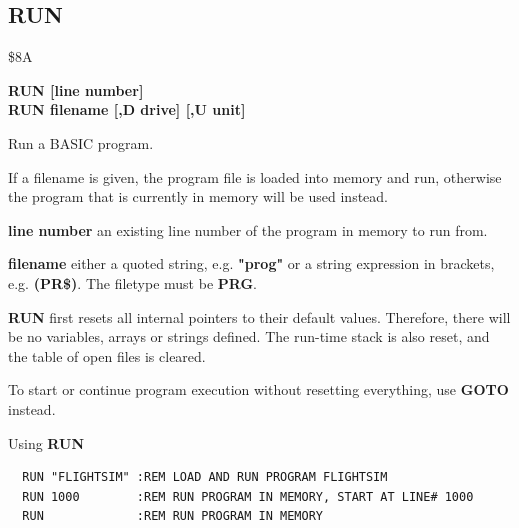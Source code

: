 
\newpage
\subsection{RUN}
\begin{description}[leftmargin=2cm,style=nextline]
\item [Token:] \$8A
\item [Format:] {\bf RUN [line number]} \\
                {\bf RUN filename [,D drive] [,U unit] }
\item [Usage:] Run a BASIC program.

   If a filename is given, the program file is loaded into
   memory and run, otherwise the program that is currently in memory
   will be used instead.

   {\bf line number} an existing line number of the program in memory to run from.

   {\bf filename} either a quoted string, e.g. {\bf "prog"} or
   a string expression in brackets, e.g. {\bf (PR\$)}.
   The filetype must be {\bf PRG}.

   \drivedefinition

   \unitdefinition

   {\bf RUN} first resets all internal pointers to their
   default values. Therefore, there will be no variables, arrays
   or strings defined. The run-time stack is also reset, and the
   table of open files is cleared.

\item [Remarks:]
   To start or continue program execution without
   resetting everything, use {\bf GOTO} instead.

\item [Examples:] Using {\bf RUN}
\begin{tcolorbox}[colback=black,coltext=white]
\verbatimfont{\codefont}
\begin{verbatim}
  RUN "FLIGHTSIM" :REM LOAD AND RUN PROGRAM FLIGHTSIM
  RUN 1000        :REM RUN PROGRAM IN MEMORY, START AT LINE# 1000
  RUN             :REM RUN PROGRAM IN MEMORY
\end{verbatim}
\end{tcolorbox}
\end{description}





\newpage
